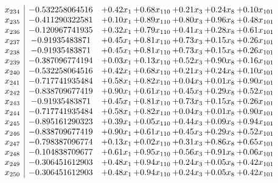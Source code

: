 \documentclass[8pt]{article}
\begin{document}
\[\begin{array}{c| c c@{\hskip 2pt} c@{\hskip 2pt} c@{\hskip 2pt} c@{\hskip 2pt} c@{\hskip 2pt} }
 x_{234}   &  -0.532258064516 & +  0.42 x_{1} & +  0.68 x_{110} & +  0.21 x_{3} & +  0.24 x_{8} & +  0.10 x_{101}\\
 x_{235}   &  -0.411290322581 & +  0.10 x_{1} & +  0.89 x_{110} & +  0.80 x_{3} & +  0.96 x_{8} & +  0.48 x_{101}\\
 x_{236}   &  -0.120967741935 & +  0.32 x_{1} & +  0.79 x_{110} & +  0.41 x_{3} & +  0.28 x_{8} & +  0.61 x_{101}\\
 x_{237}   &  -0.91935483871 & +  0.45 x_{1} & +  0.81 x_{110} & +  0.73 x_{3} & +  0.15 x_{8} & +  0.26 x_{101}\\
 x_{238}   &  -0.91935483871 & +  0.45 x_{1} & +  0.81 x_{110} & +  0.73 x_{3} & +  0.15 x_{8} & +  0.26 x_{101}\\
 x_{239}   &  -0.387096774194 & +  0.03 x_{1} & +  0.13 x_{110} & +  0.52 x_{3} & +  0.90 x_{8} & +  0.16 x_{101}\\
 x_{240}   &  -0.532258064516 & +  0.42 x_{1} & +  0.68 x_{110} & +  0.21 x_{3} & +  0.24 x_{8} & +  0.10 x_{101}\\
 x_{241}   &  -0.717741935484 & +  0.58 x_{1} & +  0.82 x_{110} & +  0.04 x_{3} & +  0.01 x_{8} & +  0.90 x_{101}\\
 x_{242}   &  -0.838709677419 & +  0.90 x_{1} & +  0.61 x_{110} & +  0.45 x_{3} & +  0.29 x_{8} & +  0.52 x_{101}\\
 x_{243}   &  -0.91935483871 & +  0.45 x_{1} & +  0.81 x_{110} & +  0.73 x_{3} & +  0.15 x_{8} & +  0.26 x_{101}\\
 x_{244}   &  -0.717741935484 & +  0.58 x_{1} & +  0.82 x_{110} & +  0.04 x_{3} & +  0.01 x_{8} & +  0.90 x_{101}\\
 x_{245}   &  -0.895161290323 & +  0.39 x_{1} & +  0.05 x_{110} & +  0.44 x_{3} & +  0.09 x_{8} & +  0.94 x_{101}\\
 x_{246}   &  -0.838709677419 & +  0.90 x_{1} & +  0.61 x_{110} & +  0.45 x_{3} & +  0.29 x_{8} & +  0.52 x_{101}\\
 x_{247}   &  -0.798387096774 & +  0.13 x_{1} & +  0.02 x_{110} & +  0.31 x_{3} & +  0.86 x_{8} & +  0.65 x_{101}\\
 x_{248}   &  -0.104838709677 & +  0.61 x_{1} & +  0.95 x_{110} & +  0.56 x_{3} & +  0.91 x_{8} & +  0.06 x_{101}\\
 x_{249}   &  -0.306451612903 & +  0.48 x_{1} & +  0.94 x_{110} & +  0.24 x_{3} & +  0.05 x_{8} & +  0.42 x_{101}\\
 x_{250}   &  -0.306451612903 & +  0.48 x_{1} & +  0.94 x_{110} & +  0.24 x_{3} & +  0.05 x_{8} & +  0.42 x_{101}\\

\end{array}\]
\end{document}
